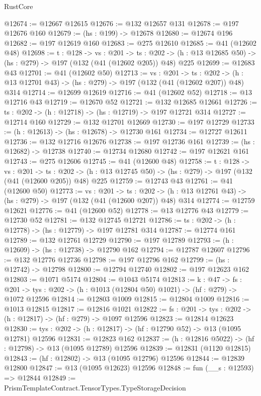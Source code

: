 \begin{lexlean}{RustCore}
\begin{coremodule}
@12674 := @12667 @12615
@12676 := @132 @12657 @131
@12678 := @197 @12676 @160
@12679 := (hs : @199) -> @12678
@12680 := @12674 @196
@12682 := @197 @12619 @160
@12683 := @275 @12610
@12685 := @41 (@12602 @48)
@12698 := {t : @128} ->
  {vs : @201} ->
  {ts : @202} -> (h : @13 @12685 @50) -> (hs : @279) -> @197 (@132 (@41 (@12602 @205)) @48) @225
@12699 := @12683 @43
@12701 := @41 (@12602 @50)
@12713 := {vs : @201} ->
  {ts : @202} -> (h : @13 @12701 @43) -> (hs : @279) -> @197 (@132 (@41 (@12602 @207)) @48) @314
@12714 := @12699 @12619
@12716 := @41 (@12602 @52)
@12718 := @13 @12716 @43
@12719 := @12670 @52
@12721 := @132 @12685 @12661
@12726 := {ts : @202} -> (h : @12718) -> (hs : @12719) -> @197 @12721 @314
@12727 := @12714 @160
@12729 := @132 @12701 @12669
@12730 := @197 @12729
@12733 := (h : @12613) -> (hs : @12678) -> @12730 @161
@12734 := @12727 @12611
@12736 := @132 @12716 @12676
@12738 := @197 @12736 @161
@12739 := (hs : @12682) -> @12738
@12740 := @12734 @12680
@12742 := @197 @12621 @161
@12743 := @275 @12606
@12745 := @41 (@12600 @48)
@12758 := {t : @128} ->
  {vs : @201} ->
  {ts : @202} -> (h : @13 @12745 @50) -> (hs : @279) -> @197 (@132 (@41 (@12600 @205)) @48) @225
@12759 := @12743 @43
@12761 := @41 (@12600 @50)
@12773 := {vs : @201} ->
  {ts : @202} -> (h : @13 @12761 @43) -> (hs : @279) -> @197 (@132 (@41 (@12600 @207)) @48) @314
@12774 := @12759 @12621
@12776 := @41 (@12600 @52)
@12778 := @13 @12776 @43
@12779 := @12730 @52
@12781 := @132 @12745 @12721
@12786 := {ts : @202} -> (h : @12778) -> (hs : @12779) -> @197 @12781 @314
@12787 := @12774 @161
@12789 := @132 @12761 @12729
@12790 := @197 @12789
@12793 := (h : @12609) -> (hs : @12738) -> @12790 @162
@12794 := @12787 @12607
@12796 := @132 @12776 @12736
@12798 := @197 @12796 @162
@12799 := (hs : @12742) -> @12798
@12800 := @12794 @12740
@12802 := @197 @12623 @162
@12803 := @1071 @5174
@12804 := @1043 @5174
@12813 := {k : @47} ->
  {fs : @201} -> {tys : @202} -> (h : @1013 (@12804 @50) @1021) -> (hf : @279) -> @1072 @12596
@12814 := @12803 @1009
@12815 := @12804 @1009
@12816 := @1013 @12815
@12817 := @12816 @1021
@12822 := {fs : @201} -> {tys : @202} -> (h : @12817) -> (hf : @279) -> @1097 @12596
@12823 := @12814 @12623
@12830 := {tys : @202} -> (h : @12817) -> (hf : @12790 @52) -> @13 (@1095 @12781) @12596
@12831 := @12823 @162
@12837 := (h : @12816 @5022) -> (hf : @12798) -> @13 (@1095 @12789) @12596
@12839 := @12831 (@1120 @12815)
@12843 := (hf : @12802) -> @13 (@1095 @12796) @12596
@12844 := @12839 @12800
@12847 := @13 (@1095 @12623) @12596
@12848 := fun (__s : @12593) => @12844
@12849 := PrismTemplateContract.TensorTypes.TypeStorageDecision

\end{coremodule}
\end{lexlean}
